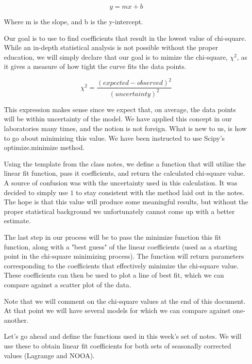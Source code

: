 \documentclass[11pt]{article}
\begin{document}
\[y=mx+b\]

Where m is the slope, and b is the y-intercept.

Our goal is to use to find coefficients that result in the lowest value
of chi-square. While an in-depth statistical analysis is not possible
without the proper education, we will simply declare that our goal is to
mimize the chi-square, \(\chi^2\), as it gives a measure of how tight
the curve fits the data points.

\[\chi^2=\dfrac{(expected-observed)^2}{(uncertainty)^2}\]

This expression makes sense since we expect that, on average, the data
points will be within uncertainty of the model. We have applied this
concept in our laboratories many times, and the notion is not foreign.
What is new to us, is how to go about minimizing this value. We have
been instructed to use Scipy's optimize.minimize method.

Using the template from the class notes, we define a function that will
utilize the linear fit function, pass it coefficients, and return the
calculated chi-square value. A source of confusion was with the
uncertainty used in this calculation. It was decided to simply use \(1\)
to stay consistent with the method laid out in the notes. The hope is
that this value will produce some meaningful results, but without the
proper statistical background we unfortunately cannot come up with a
better estimate.

The last step in our process will be to pass the minimize function this
fit function, along with a "best guess" of the linear coefficients (used
as a starting point in the chi-square minimizing process). The function
will return parameters corresponding to the coefficients that
effectively minimize the chi-square value. These coefficients can then
be used to plot a line of best fit, which we can compare against a
scatter plot of the data.

Note that we will comment on the chi-square values at the end of this
document. At that point we will have several models for which we can
compare against one-another.

Let's go ahead and define the functions used in this week's set of
notes. We will use these to obtain linear fit coefficients for both sets
of seasonally corrected values (Lagrange and NOOA).
\end{document}

